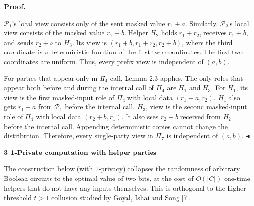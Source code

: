 


\par\medskip\noindent\textbf{Proof.}\par




$\mathcal{P}_{1}$’s local view consists only of the sent masked value $r_{1}+a$. Similarly, $\mathcal{P}_{2}$’s local view consists of the masked value $r_{1}+b$. Helper $H_{2}$ holds $r_{1}+r_{2}$, receives $r_{1}+b$, and sends $r_{2}+b$ to $H_{3}$. Its view is $(r_{1}+b,r_{1}+r_{2},r_{2}+b)$, where the third coordinate is a deterministic function of the first two coordinates. The first two coordinates are uniform. Thus, every prefix view is independent of $(a,b)$.\par




For parties that appear only in $\Pi_{4}$ call, Lemma 2.3 applies. The only roles that appear both before and during the internal call of $\Pi_{4}$ are $H_{1}$ and $H_{3}$. For $H_{1}$, its view is the first masked-input role of $\Pi_{4}$ with local data $(r_{1}+a,r_{2})$. $H_{1}$ also gets $r_{1}+a$ from $\mathcal{P}_{1}$ before the internal call. $H_{3}$, view is the second masked-input role of $\Pi_{4}$ with local data $(r_{2}+b,r_{1})$. It also sees $r_{2}+b$ received from $H_{2}$ before the internal call. Appending deterministic copies cannot change the distribution. Therefore, every single-party view in $\Pi_{7}$ is independent of $(a,b)$.
$\blacktriangleleft$\par







\par\medskip\noindent\textbf{
3 1-Private computation with helper parties}\par




The construction below (with $1$-privacy) collapses the randomness of arbitrary Boolean circuits to the optimal value of two bits, at the cost of $O(|C|)$ one-time helpers that do not have any inputs themselves. This is orthogonal to the higher-threshold $t>1$ collusion studied by Goyal, Ishai and Song [7].\par




